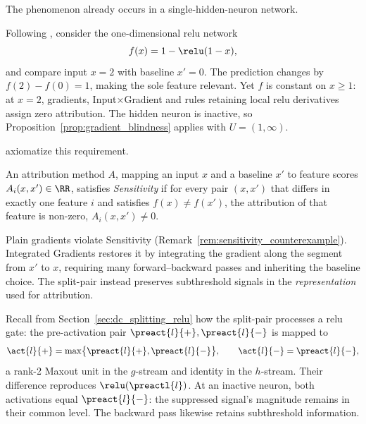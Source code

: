 The phenomenon already occurs in a single-hidden-neuron network.

\begin{remark}\label{rem:sensitivity_counterexample}
Following \textcite{Sundararajan2017}, consider the one-dimensional \ac{relu} network
\begin{equation}
	f(x) = 1 - \relu(1 - x),
	\label{eq:ig_counterexample}
\end{equation}
and compare input $x=2$ with baseline $x'=0$. The prediction changes by $f(2)-f(0)=1$, making the sole feature relevant. Yet $f$ is constant on $x\geq1$: at $x=2$, gradients, Input$\times$Gradient and rules retaining local \ac{relu} derivatives assign zero attribution. The hidden neuron is inactive, so Proposition~\ref{prop:gradient_blindness} applies with $U=(1,\infty)$.
\end{remark}

\textcite{Sundararajan2017} axiomatize this requirement.

\begin{definition}[Sensitivity(a)]\label{def:sensitivity}
An attribution method $A$, mapping an input $x$ and a baseline $x'$ to feature scores $A_i(x, x') \in \RR$, satisfies \emph{Sensitivity} if for every pair $(x, x')$ that differs in exactly one feature $i$ and satisfies $f(x) \neq f(x')$, the attribution of that feature is non-zero, $A_i(x, x') \neq 0$.
\end{definition}

Plain gradients violate Sensitivity (Remark~\ref{rem:sensitivity_counterexample}). Integrated Gradients restores it by integrating the gradient along the segment from $x'$ to $x$, requiring many forward--backward passes and inheriting the baseline choice. The split-pair instead preserves subthreshold signals in the \emph{representation} used for attribution.

Recall from Section~\ref{sec:dc_splitting_relu} how the split-pair processes a \ac{relu} gate: the pre-activation pair $\preact{l}{+}, \preact{l}{-}$ is mapped to
\begin{equation}
	\act{l}{+} = \max\bigl\{\preact{l}{+}, \preact{l}{-}\bigr\},
	\qquad
	\act{l}{-} = \preact{l}{-},
	\label{eq:split_maxout_gate}
\end{equation}
a rank-2 Maxout unit in the $g$-stream and identity in the $h$-stream. Their difference reproduces $\relu(\preactl{l})$. At an inactive neuron, both activations equal $\preact{l}{-}$: the suppressed signal's magnitude remains in their common level. The backward pass likewise retains subthreshold information.

